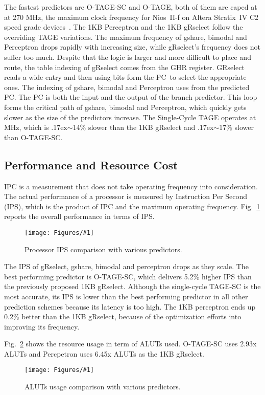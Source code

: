 \documentclass[conference]{IEEEtran}
\newcommand{\mytilde}{{\raise.17ex\hbox{$\scriptstyle\sim$}}}
\newcommand{\kfig}[4]{ %
        \begin{figure}[!t]
        \centering
        \texttt{[image: Figures/\#1]}
        \vspace{-1mm}
        \caption{#3}
        \label{#2}
        \end{figure}
}
\begin{document}
The fastest predictors are \mbox{O-TAGE-SC} and \mbox{O-TAGE}, both of them are caped at at 270 MHz, the maximum clock frequency for Nios~II-f on Altera Stratix~IV C2 speed grade devices~\cite{niosfmax}. The 1KB Perceptron and the 1KB gRselect follow the overriding TAGE variations. The maximum frequency of gshare, bimodal and Perceptron drops rapidly with increasing size, while gRselect's frequency does not suffer too much. Despite that the logic is larger and more difficult to place and route,  the table indexing of gRselect comes from the GHR register. GRselect reads a wide entry and then using bits form the PC\ to select the appropriate ones. The indexing of gshare, bimodal and Perceptron uses from the predicted PC. The PC is both the input and the output of the branch predictor. This loop forms the critical path of gshare, bimodal and Perceptron, which quickly gets slower as the size of the predictors increase. The Single-Cycle TAGE operates at MHz, which is \mytilde14\% slower than the 1KB gRselect and \mytilde 17\% slower than \mbox{O-TAGE-SC}.

\subsection{Performance and Resource Cost}
\label{sec:eval:perf}
IPC is a measurement that does not take operating frequency into consideration. The actual performance of a processor is measured by Instruction Per Second (IPS), which is the product of IPC and the maximum operating frequency. Fig.~\ref{fig:adips} reports the overall performance in terms of IPS.
\kfig{adips.pdf}{fig:adips}{Processor IPS comparison with various predictors.}{angle = 0, trim = 0.9in 2.7in 0.7in 2.6in, clip, width=0.5\textwidth}

The IPS of gRselect, gshare, bimodal and perceptron drops as they scale. The best performing predictor is \mbox{O-TAGE-SC}, which delivers 5.2\% higher IPS than the previously proposed 1KB gRselect. Although the single-cycle \mbox{TAGE-SC} is the most accurate, its IPS is lower than the best performing predictor in all other prediction schemes  because its latency is too high. The 1KB perceptron ends up 0.2\% better than the 1KB gRselect, because of the optimization efforts into improving its frequency. 

Fig.~\ref{fig:adarea} shows the resource usage in term of ALUTs used. \mbox{O-TAGE-SC} uses 2.93x ALUTs and Percpetron uses 6.45x ALUTs as the 1KB gRselect.
\kfig{adarea.pdf}{fig:adarea}{ALUTs usage comparison with various predictors.}{angle = 0, trim = 0.9in 2.7in 0.7in 2.7in, clip, width=0.4\textwidth}
\end{document}
